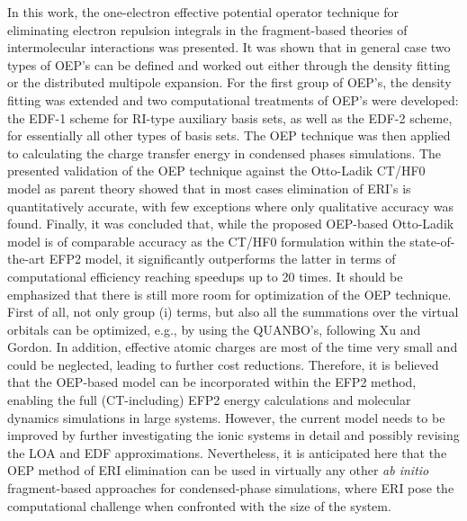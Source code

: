In this work, the one\hyp{}electron effective potential operator technique
for eliminating electron repulsion integrals in the fragment\hyp{}based
theories of intermolecular interactions
was presented.
It was shown that in general case two types of OEP's
can be defined and worked out either through the density fitting or the distributed
multipole expansion. For the first group of OEP's, the density fitting was extended
and two computational treatments of OEP's were developed: the EDF-1 scheme
for RI\hyp{}type auxiliary basis sets, as well as the EDF-2 scheme, for
essentially all other types of basis sets. 
The OEP technique was then applied to calculating the charge transfer energy
in condensed phases simulations. 
The presented validation of the OEP technique
against the Otto\hyp{}Ladik CT/HF0 model as parent theory showed that in most cases
elimination of ERI's is quantitatively accurate, with few exceptions
where only qualitative accuracy was found. 
Finally, it was concluded that, while the proposed OEP\hyp{}based Otto\hyp{}Ladik
model is of comparable accuracy as the CT/HF0 formulation within the
state\hyp{}of\hyp{}the\hyp{}art EFP2 model, it significantly outperforms the latter
in terms of computational efficiency reaching speedups up to 20 times.
It should be emphasized that there is still more room for optimization of the
OEP technique. First of all, not only group (i) terms, but also
all the summations over the virtual orbitals can be optimized,
e.g., by using the QUANBO's, following Xu and Gordon.\cite{Xu.Gordon.JCP.2013}
In addition, effective atomic charges are most of the time very small
and could be neglected, leading to further cost reductions.
Therefore, it is believed that the OEP\hyp{}based
model can be incorporated within the EFP2 method, enabling
the full (CT\hyp{}including) EFP2 energy calculations and 
molecular dynamics simulations in large systems. However, the current model
needs to be improved by further investigating the ionic
systems in detail and possibly revising the LOA and EDF approximations.
Nevertheless,
it is anticipated here that the OEP method of ERI elimination can be used in 
virtually any other 
\emph{ab initio} fragment\hyp{}based
approaches for condensed\hyp{}phase simulations, where ERI pose the
computational challenge when confronted with the size of the system.


